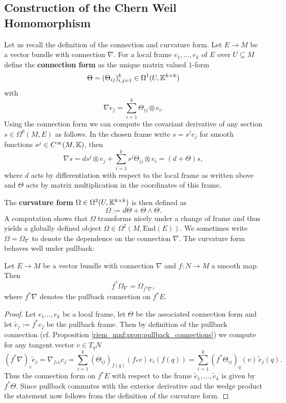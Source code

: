 \subsection{Construction of the Chern Weil Homomorphism}

Let us recall the definition of the connection and curvature form. Let $E \to M$ be a vector bundle with connection $\nabla$. For a local frame $e_1,\ldots,e_k$ of $E$ over $U \subseteq M$ define the \textbf{connection form} as the unique matrix valued $1$-form $$\Theta = (\Theta_{ij})_{i,j=1}^k \in \Omega^1(U,\mathbb{K}^{k\times k})$$ with
\[
\nabla e_j = \sum_{i=1}^{k} \Theta_{ij} \otimes e_i.
\]
Using the connection form we can compute the covariant derivative of any section $s \in \Omega^0(M,E)$ as follows. In the chosen frame write $s = s^je_j$ for smooth functions $s^j \in C^\infty(M,\mathbb{K})$, then 
\[
\nabla s = ds^j \otimes e_j + \sum_{i=1}^{k} s^j \Theta_{ij} \otimes e_i = (d + \Theta)s,
\]
where $d$ acts by differentiation with respect to the local frame as written above and $\Theta$ acts by matrix multiplication in the coordinates of this frame.

The \textbf{curvature form} $\Omega \in \Omega^2(U,\mathbb{K}^{k\times k})$ is then defined as 
\[
\Omega := d \Theta + \Theta \wedge \Theta.
\]
A computation shows that $\Omega$ transforms nicely under a change of frame and thus yields a globally defined object $\Omega \in \Omega^2(M,\mathrm{End}(E))$. We sometimes write $\Omega = \Omega_{\nabla}$ to denote the dependence on the connection $\nabla$. The curvature form behaves well under pullback:

\begin{lemma}
    \label{chern_weil:lem:naturality_of_curvature_form}
    Let $E \to M$ be a vector bundle with connection $\nabla$ and $f \colon N \to M$ a smooth map. Then 
    \[
    f^\ast \Omega_{\nabla} = \Omega_{f^\ast \nabla},
    \]
    where $f^\ast\nabla$ denotes the pullback connection on $f^\ast E$.
\end{lemma}
\begin{proof}
    Let $e_1\ldots,e_k$ be a local frame, let $\Theta$ be the associated connection form and let $\tilde{e}_j := f^\ast e_j$ be the pullback frame. Then by definition of the pullback connection (cf. Proposition \ref{riem_mnf:prop:pullback_connections}) we compute for any tangent vector $v \in T_qN$
    \[
    (f^\ast\nabla)_v \tilde{e}_j = \nabla_{f_\ast v} e_j = \sum_{i=1}^{k} (\Theta_{ij})_{f(q)}(f_\ast v)\, e_i(f(q)) = \sum_{i=1}^{k}(f^\ast \Theta_{ij})_q(v) \,\tilde{e}_j(q).
    \]
    Thus the connection form on $f^\ast E$ with respect to the frame $\tilde{e}_1,\ldots,\tilde{e}_k$ is given by $f^\ast \Theta$. Since pullback commutes with the exterior derivative and the wedge product the statement now follows from the definition of the curvature form.
\end{proof}

